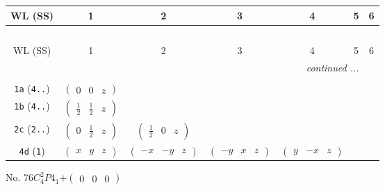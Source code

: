 \documentclass[fleqn,9pt,landscape]{jsarticle}
\begin{document}
\begin{center}
\renewcommand{\arraystretch}{1.2}
\begin{longtable}{ccccccc}
 \hline \hline
WL (SS) & 1 & 2 & 3 & 4 & 5 & 6 \\ \hline \endfirsthead

\multicolumn{6}{l}{\tablename\ \thetable{}} \\
 \hline \hline
WL (SS) & 1 & 2 & 3 & 4 & 5 & 6 \\ \hline \endhead

 \hline \hline
\multicolumn{6}{r}{\footnotesize\it continued ...} \\ \endfoot

 \hline \hline
\multicolumn{6}{r}{} \\ \endlastfoot

{\tt 1a} ({\tt 4..}) & $ \begin{pmatrix} 0 & 0 & z \end{pmatrix} $ & $  $ & $  $ & $  $ \\ \hline
{\tt 1b} ({\tt 4..}) & $ \begin{pmatrix} \frac{1}{2} & \frac{1}{2} & z \end{pmatrix} $ & $  $ & $  $ & $  $ \\ \hline
{\tt 2c} ({\tt 2..}) & $ \begin{pmatrix} 0 & \frac{1}{2} & z \end{pmatrix} $ & $ \begin{pmatrix} \frac{1}{2} & 0 & z \end{pmatrix} $ & $  $ & $  $ \\ \hline
{\tt 4d} ({\tt 1}) & $ \begin{pmatrix} x & y & z \end{pmatrix} $ & $ \begin{pmatrix} - x & - y & z \end{pmatrix} $ & $ \begin{pmatrix} - y & x & z \end{pmatrix} $ & $ \begin{pmatrix} y & - x & z \end{pmatrix} $ \\
\end{longtable}
\end{center}
\newpage
No. 76\quad$C_{4}^{2}$\quad$P4_1$\quad[ tetragonal ]\quad$+\begin{pmatrix} 0 & 0 & 0 \end{pmatrix}$
\end{document}
